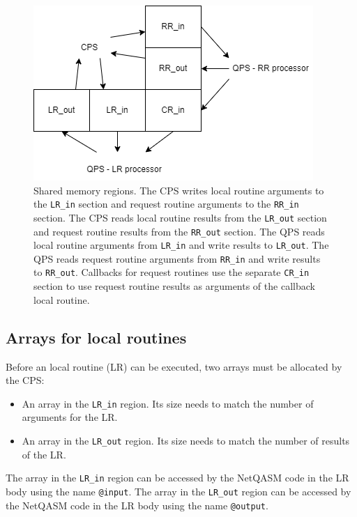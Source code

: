 \begin{figure}[ht]
    \centering
    \includegraphics[width=\columnwidth]{figures/qoala/shared_memory.png}
    \caption{Shared memory regions.
    The CPS writes local routine arguments to the \texttt{LR\_in} section and request routine arguments to the \texttt{RR\_in} section.
    The CPS reads local routine results from the \texttt{LR\_out} section and request routine results from the \texttt{RR\_out} section.
    The QPS reads local routine arguments from \texttt{LR\_in} and write results to \texttt{LR\_out}.
    The QPS reads request routine arguments from \texttt{RR\_in} and write results to \texttt{RR\_out}.
    Callbacks for request routines use the separate \texttt{CR\_in} section to use request routine results as arguments of the callback local routine.
    }
    \label{fig:app:shared_memory}
\end{figure}


\subsection{Arrays for local routines}
Before an local routine (LR) can be executed, two arrays must be allocated by the CPS:
\begin{itemize}
\item An array in the \texttt{LR\_in} region. Its size needs to match the number of arguments for the LR.
\item An array in the \texttt{LR\_out} region. Its size needs to match the number of results of the LR.
\end{itemize}

The array in the \texttt{LR\_in} region can be accessed by the NetQASM code in the LR body using the name \texttt{@input}.
The array in the \texttt{LR\_out} region can be accessed by the NetQASM code in the LR body using the name \texttt{@output}.

